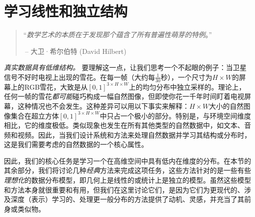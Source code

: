 \documentclass[../../book-main_zh.tex]{subfiles}
\begin{document}
\chapter{学习线性和独立结构}
\label{ch:classic}\label{ch:linear-independent}

\begin{quote}
\hfill  ``{\em 数学艺术的本质在于发现那个蕴含了所有普遍性萌芽的特例}。''

$~$\hfill -- 大卫·希尔伯特 (David Hilbert)
\end{quote}
\vspace{5mm}







\textit{真实数据具有低维结构。} 要理解这一点，让我们思考一个不起眼的例子：当卫星信号不好时电视上出现的雪花。在每一帧（大约每\(\frac{1}{30}\)秒），一个尺寸为\(H \times W\)的屏幕上的RGB雪花，大致是从\([0, 1]^{3 \times H \times W}\)上的均匀分布中独立采样的。理论上，任何一帧的雪花\textit{都可能}碰巧构成一幅自然图像，但即使你花一千年时间盯着电视屏幕，这种情况也不会发生。这种差异可以用以下事实来解释：\(H \times W\)大小的自然图像集合在超立方体\([0, 1]^{3 \times H \times W}\)中只占一个极小的部分。特别是，与环境空间维度相比，它的维度极低。类似现象也发生在所有其他类型的自然数据中，如文本、音频和视频。因此，当我们设计系统和方法来处理自然数据并学习其结构或分布时，这是我们需要考虑的自然数据的一个核心属性。%

因此，我们的核心任务是学习一个在高维空间中具有低内在维度的分布。在本节的其余部分，我们将讨论几种\textit{经典}方法来完成这项任务，这些方法针对的是一些有些\textit{理想化}的数据分布模型，即几何上是线性的或统计上是独立的模型。虽然这些模型和方法本身就很重要和有用，但我们在这里讨论它们，是因为它们为更现代的、涉及深度（表示）学习的、处理更一般分布的方法提供了动机、灵感，并充当了其前身或类似物。
\end{document}
